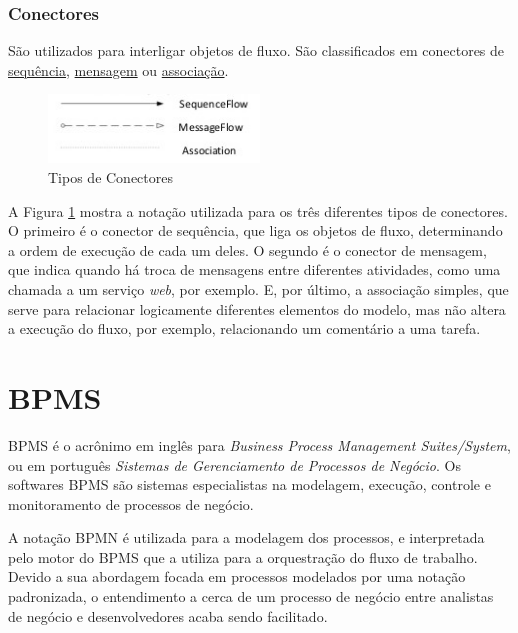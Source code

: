 \subsubsection{Conectores}\label{sec:bpm-bpmn_objetos_conectores}

    São utilizados para interligar objetos de fluxo. São classificados em conectores de \underline{sequência}, \underline{mensagem} ou \underline{associação}.

    \begin{figure}[H]
    \centering
    \includegraphics[width=0.5\textwidth]{imagens/bpmn_connectors.jpg}
    \caption{Tipos de Conectores\cite{tipos_conectores}}
    \label{fig:bpmn_conectors}
    \end{figure}
    
    A Figura \ref{fig:bpmn_conectors} mostra a notação utilizada para os três diferentes tipos de conectores. O primeiro é o conector de sequência, que liga os objetos de fluxo, determinando a ordem de execução de cada um deles. O segundo é o conector de mensagem, que indica quando há troca de mensagens entre diferentes atividades, como uma chamada a um serviço \textit{web}, por exemplo. E, por último, a associação simples, que serve para relacionar logicamente diferentes elementos do modelo, mas não altera a execução do fluxo, por exemplo, relacionando um comentário a uma tarefa. 


\section{BPMS}\label{sec:automatizacao-processos-bpms}

BPMS\cite{bpms} é o acrônimo em inglês para \textit{Business Process Management Suites/System}, ou em português \textit{Sistemas de Gerenciamento de Processos de Negócio}. Os softwares BPMS são sistemas especialistas na modelagem, execução, controle e monitoramento de processos de negócio. 

A notação BPMN é utilizada para a modelagem dos processos, e interpretada pelo motor do BPMS que a utiliza para a orquestração do fluxo de trabalho. Devido a sua abordagem focada em processos modelados por uma notação padronizada, o entendimento a    cerca de um processo de negócio entre analistas de negócio e desenvolvedores acaba sendo facilitado. 

